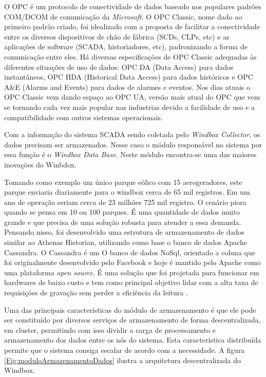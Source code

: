 O OPC é um protocolo de conectividade de dados baseado nos populares padrões COM/DCOM de comunicação da \textit{Microsoft}. O OPC Classic, nome dado ao primeiro padrão criado, foi idealizado com a proposta de facilitar a conectividade entre os diversos dispositivos de chão de fábrica (SCDs, CLPs, etc) e as aplicações de software (SCADA, historiadores, etc), padronizando a forma de comunicação entre eles. Há diversas especificações de OPC Classic adequadas às diferentes situações de uso de dados: OPC DA (Data Access) para dados instantâneos, OPC HDA (Historical Data Access) para dados históricos e OPC A\&E (Alarms and Events) para dados de alarmes e eventos. Nos dias atuais o OPC Classic vem dando espaço ao OPC UA, versão mais atual do OPC que vem se tornando cada vez mais popular nas industrias devido a facilidade de uso e a compatibilidade com outros sistemas operacionais.

Com a informação do sistema SCADA sendo coletada pelo \textit{Windbox Collector}, os dados precisam ser armazenados. Nesse caso o módulo responsável no sistema por essa função é o \textit{Windbox Data Base}. Neste módulo encontra-se uma das maiores inovações do Winbdox.

Tomando como exemplo um único parque eólico com 15 aerogeradores, este parque enviaria diariamente para o windbox cerca de 65 mil registros. Em um ano de operação seriam cerca de 23 milhões 725 mil registro. O cenário piora quando se pensa em 10 ou 100 parques. É uma quantidade de dados muito grande e que precisa de uma solução robusta para atender a essa demanda. Pensando nisso, foi desenvolvido uma estrutura de armazenamento de dados similar ao Athenas Historian, utilizando como base o banco de dados Apache Cassandra. O Cassandra é um O banco de dados NoSql, orientado a coluna que foi originalmente desenvolvido pelo Facebook e hoje é mantido pelo Apache como uma plataforma \textit{open source}. É uma solução que foi projetada para funcionar em hardwares de baixo custo e tem como principal objetivo lidar com a alta taxa de requisições de gravação sem perder a eficiência da leitura \cite{cassandra-banco-dados}.

Uma das principais características do módulo de armazenamento é que ele pode ser constituído por diversos serviços de armazenamento de forma descentralizada, em cluster, permitindo com isso dividir a carga de processamento e armazenamento dos dados entre os nós do sistema. Esta característica distribuída permite que o sistema consiga escalar de acordo com a necessidade. A figura \ref{Fig:moduloArmazenamentoDados} ilustra a arquitetura descentralizada do Windbox.

